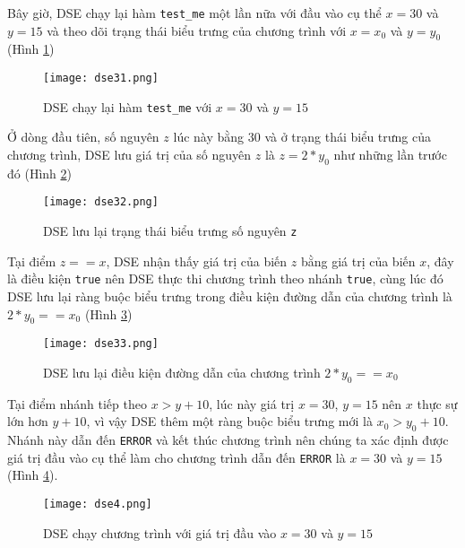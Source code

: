 Bây giờ, DSE chạy lại hàm \texttt{test\_me} một lần nữa với đầu vào cụ thể $ x = 30 $ và $ y = 15 $ và theo dõi trạng thái biểu trưng của chương trình với $x = x_{0}$ và $y = y_{0}$ (Hình \ref{fig:dse31})

\begin{figure}[H]	
	\begin{center}
		\texttt{[image: dse31.png]}
	\end{center}
	\caption{DSE chạy lại hàm \texttt{test\_me} với $ x = 30 $ và $ y = 15 $}
	\label{fig:dse31}
\end{figure}


Ở dòng đầu tiên, số nguyên $ z $ lúc này bằng $ 30 $ và ở trạng thái biểu trưng của chương trình, DSE lưu giá trị của số nguyên $ z $ là $ z = 2*y_{0} $ như những lần trước đó (Hình \ref{fig:dse32})

\begin{figure}[H]	
	\begin{center}
		\texttt{[image: dse32.png]}
	\end{center}
	\caption{DSE lưu lại trạng thái biểu trưng số nguyên \texttt{z}}
	\label{fig:dse32}
\end{figure}

Tại điểm $ z == x $, DSE nhận thấy giá trị của biến $ z $ bằng giá trị của biến $ x $, đây là điều kiện \texttt{true} nên DSE thực thi chương trình theo nhánh \texttt{true}, cùng lúc đó DSE lưu lại ràng buộc biểu trưng trong điều kiện đường dẫn của chương trình là $ 2*y_{0} == x_{0} $ (Hình \ref{fig:dse33})

\begin{figure}[H]	
	\begin{center}
		\texttt{[image: dse33.png]}
	\end{center}
	\caption{DSE lưu lại điều kiện đường dẫn của chương trình $ 2*y_{0} == x_{0} $}
	\label{fig:dse33}
\end{figure}

Tại điểm nhánh tiếp theo $ x > y+10 $, lúc này giá trị $ x = 30 $, $ y = 15 $ nên $ x $ thực sự lớn hơn $ y+10 $, vì vậy DSE thêm một ràng buộc biểu trưng mới là $ x_{0} > y_{0}+ 10 $. Nhánh này dẫn đến \texttt{ERROR} và kết thúc chương trình nên chúng ta xác định được giá trị đầu vào cụ thể làm cho chương trình dẫn đến \texttt{ERROR} là $ x = 30 $ và $ y = 15 $ (Hình \ref{fig:dse4}).

\begin{figure}[H]
	\begin{center}
		\texttt{[image: dse4.png]}
	\end{center}	
	\caption{DSE chạy chương trình với giá trị đầu vào $x = 30$ và $y = 15$}
\label{fig:dse4}
\end{figure}

